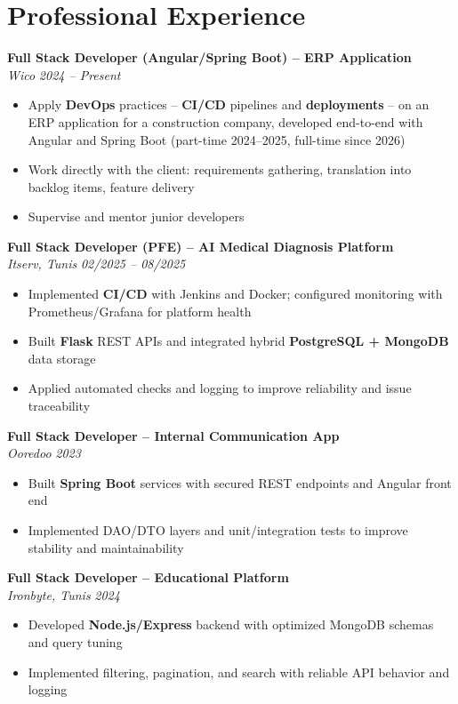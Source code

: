 \documentclass[10pt,a4paper]{article}
\begin{document}
\vspace{6pt}

\section*{Professional Experience}
{\small

\textbf{Full Stack Developer (Angular/Spring Boot) -- ERP Application}\\[1pt]
\textit{Wico} \hfill \textit{2024 -- Present}
\begin{itemize}
  \item Apply \textbf{DevOps} practices -- \textbf{CI/CD} pipelines and \textbf{deployments} -- on an ERP application for a construction company, developed end-to-end with Angular and Spring Boot (part-time 2024--2025, full-time since 2026)
  \item Work directly with the client: requirements gathering, translation into backlog items, feature delivery
  \item Supervise and mentor junior developers
\end{itemize}

\vspace{3pt}
\textbf{Full Stack Developer (PFE) -- AI Medical Diagnosis Platform}\\[1pt]
\textit{Itserv, Tunis} \hfill \textit{02/2025 -- 08/2025}
\begin{itemize}
  \item Implemented \textbf{CI/CD} with Jenkins and Docker; configured monitoring with Prometheus/Grafana for platform health
  \item Built \textbf{Flask} REST APIs and integrated hybrid \textbf{PostgreSQL + MongoDB} data storage
  \item Applied automated checks and logging to improve reliability and issue traceability
\end{itemize}

\vspace{3pt}
\textbf{Full Stack Developer -- Internal Communication App}\\[1pt]
\textit{Ooredoo} \hfill \textit{2023}
\begin{itemize}
  \item Built \textbf{Spring Boot} services with secured REST endpoints and Angular front end
  \item Implemented DAO/DTO layers and unit/integration tests to improve stability and maintainability
\end{itemize}

\vspace{3pt}
\textbf{Full Stack Developer -- Educational Platform}\\[1pt]
\textit{Ironbyte, Tunis} \hfill \textit{2024}
\begin{itemize}
  \item Developed \textbf{Node.js/Express} backend with optimized MongoDB schemas and query tuning
  \item Implemented filtering, pagination, and search with reliable API behavior and logging
\end{itemize}

}
\end{document}
